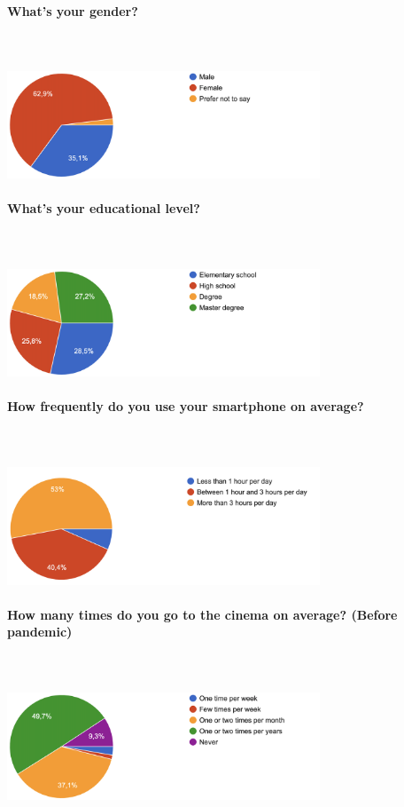 \documentclass[12pt, a4paper]{article}
\numberwithin{figure}{section}
\begin{document}
\paragraph{What's your gender?}\mbox{}\\\\
\includegraphics[width=0.7\textwidth]{Images/gender.png}\\

\paragraph{What's your educational level?}\mbox{}\\\\
\includegraphics[width=0.7\textwidth]{Images/education.png}\\

\paragraph{How frequently do you use your smartphone on average?}\mbox{}\\\\
\includegraphics[width=0.7\textwidth]{Images/timeAtPhone.png}\\

\paragraph{How many times do you go to the cinema on average? (Before pandemic)}\mbox{}\\\\
\includegraphics[width=0.7\textwidth]{Images/timeAtCinema.png}\\
\end{document}
